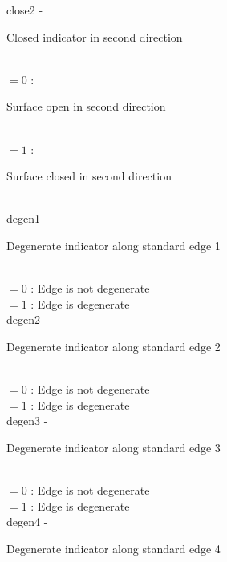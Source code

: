         \>\>    {\fov close2}\> - \>    \begin{minipg2}
                                Closed indicator in second direction
                                \end{minipg2}\\
                \>\>\>\>\>      $=0$ :\>\begin{minipg5}
                                Surface open in second direction
                                \end{minipg5}\\[0.8ex]
                \>\>\>\>\>      $=1$ :\>\begin{minipg5}
                                Surface closed in second direction
                                \end{minipg5}\\[0.8ex]
        \>\>    {\fov degen1}\> - \>    \begin{minipg2}
                                Degenerate indicator along standard edge 1
                                \end{minipg2}\\
                \>\>\>\>\>      $=0$ :\>        Edge is not degenerate\\
                \>\>\>\>\>      $=1$ :\>        Edge is degenerate\\
        \>\>    {\fov degen2}\> - \>    \begin{minipg2}
                                Degenerate indicator along standard edge 2
                                \end{minipg2}\\
                \>\>\>\>\>      $=0$ :\>        Edge is not degenerate\\
                \>\>\>\>\>      $=1$ :\>        Edge is degenerate\\
        \>\>    {\fov degen3}\> - \>    \begin{minipg2}
                                Degenerate indicator along standard edge 3
                                \end{minipg2}\\
                \>\>\>\>\>      $=0$ :\>        Edge is not degenerate\\
                \>\>\>\>\>      $=1$ :\>        Edge is degenerate\\
        \>\>    {\fov degen4}\> - \>    \begin{minipg2}
                                Degenerate indicator along standard edge 4
                                \end{minipg2}\\
